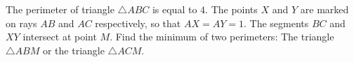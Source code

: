 The perimeter of triangle $\triangle ABC$ is equal to $4$. The points $X$ and $Y$ are marked on rays $AB$ and $AC$ respectively, so that $AX=AY=1$. The segments $BC$ and $XY$ intersect at point $M$. Find the minimum of two perimeters: The triangle $\triangle ABM$ or the triangle $\triangle ACM$.